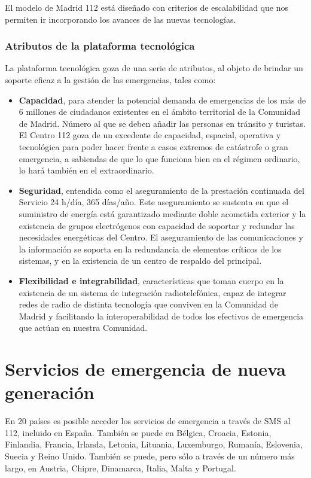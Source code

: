 El modelo de Madrid 112 está diseñado con criterios de escalabilidad que nos permiten ir incorporando los avances de las nuevas tecnologías.

\subsubsection{Atributos de la plataforma tecnológica}

La plataforma tecnológica goza de una serie de atributos, al objeto de brindar un soporte eficaz a la gestión de las emergencias, tales como:

\begin{itemize}
  \item \textbf{Capacidad}, para atender la potencial demanda de emergencias de los más de 6 millones de ciudadanos existentes en el ámbito territorial de la Comunidad de Madrid. Número al que se deben añadir las personas en tránsito y turistas. El Centro 112 goza de un excedente de capacidad, espacial, operativa y tecnológica para poder hacer frente a casos extremos de catástrofe o gran emergencia, a sabiendas de que lo que funciona bien en el régimen ordinario, lo hará también en el extraordinario.
  \item \textbf{Seguridad}, entendida como el aseguramiento de la prestación continuada del Servicio 24 h/día, 365 días/año. Este aseguramiento se sustenta en que el suministro de energía está garantizado mediante doble acometida exterior y la existencia de grupos electrógenos con capacidad de soportar y redundar las necesidades energéticas del Centro. El aseguramiento de las comunicaciones y la información se soporta en la redundancia de elementos críticos de los sistemas, y en la existencia de un centro de respaldo del principal.
  \item \textbf{Flexibilidad e integrabilidad}, características que toman cuerpo en la existencia de un sistema de integración radiotelefónica, capaz de integrar redes de radio de distinta tecnología que conviven en la Comunidad de Madrid y facilitando la interoperabilidad de todos los efectivos de emergencia que actúan en nuestra Comunidad.
\end{itemize}

\section{Servicios de emergencia de nueva generación}

En 20 países es posible acceder los servicios de emergencia a través de SMS al 112, incluido en España. También se puede en Bélgica, Croacia, Estonia, Finlandia, Francia, Irlanda, Letonia, Lituania, Luxemburgo, Rumanía, Eslovenia, Suecia y Reino Unido. También se puede, pero sólo a través de un número más largo, en Austria, Chipre, Dinamarca, Italia, Malta y Portugal.

